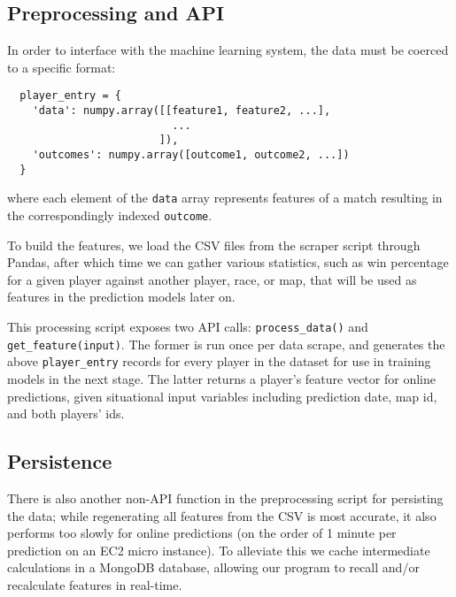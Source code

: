 \subsection{Preprocessing and API}

In order to interface with the machine learning system, the data must be coerced to a specific format:

\begin{verbatim}
  player_entry = {
    'data': numpy.array([[feature1, feature2, ...],
                          ...
                        ]),
    'outcomes': numpy.array([outcome1, outcome2, ...])
  }
\end{verbatim}

where each element of the \verb$data$ array represents features of a match resulting in the correspondingly indexed \verb$outcome$.

To build the features, we load the CSV files from the scraper script through Pandas, after which time we can gather various statistics, such as win percentage for a given player against another player, race, or map, that will be used as features in the prediction models later on. 

This processing script exposes two API calls: \verb$process_data()$ and \verb$get_feature(input)$. The former is run once per data scrape, and generates the above \verb$player_entry$ records for every player in the dataset for use in training models in the next stage. The latter returns a player's feature vector for online predictions, given situational input variables including prediction date, map id, and both players' ids.

\subsection{Persistence}

There is also another non-API function in the preprocessing script for persisting the data; while regenerating all features from the CSV is most accurate, it also performs too slowly for online predictions (on the order of 1 minute per prediction on an EC2 micro instance). To alleviate this we cache intermediate calculations in a MongoDB database, allowing our program to recall and/or recalculate features in real-time.